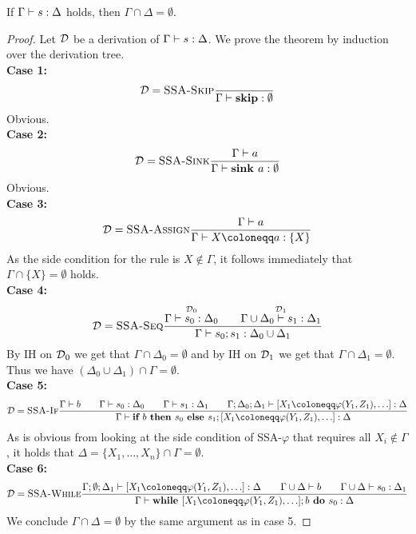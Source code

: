 \begin{theorem}
    If $\Gamma \vdash {s}: \Delta$ holds, then $\Gamma \cap \Delta = \emptyset$.
\end{theorem}
\begin{proof}
    Let $\operatorname{\mathcal{D}}$ be a derivation of $\Gamma \vdash {s}: \Delta$.
    We prove the theorem by induction over the derivation tree.\\
    \textbf{Case 1:}
    \begin{align*}
        \operatorname{\mathcal{D}} = \textsc{SSA-Skip}\frac{\displaystyle }{\displaystyle \Gamma \vdash {\textbf{skip}}: \emptyset}
    \end{align*}
    Obvious.\\
    \textbf{Case 2:}
    \begin{align*}
        \operatorname{\mathcal{D}} = \textsc{SSA-Sink}\frac{\displaystyle \Gamma \vdash {a}}{\displaystyle \Gamma \vdash {\textbf{sink }{a}}: \emptyset}
    \end{align*}
    Obvious.\\
    \textbf{Case 3:}
    \begin{align*}
        \D = \rule{SSA-Assign}{\typestmt{\Gamma}{a}}{\typestep{\Gamma}{\defaultstore}{\{X\}}}
    \end{align*}
    As the side condition for the rule is $X \notin \Gamma$, it follows immediately that 
    $\Gamma \cap \{X\} = \emptyset$ holds.\\
    \textbf{Case 4:}
    \begin{align*}
        \operatorname{\mathcal{D}} = \textsc{SSA-Seq}\frac{\displaystyle \overset{\operatorname{\mathcal{D}}_0}{\Gamma \vdash {s_0}: \Delta_0}\qquad
        \overset{\operatorname{\mathcal{D}}_1}{\Gamma \cup \Delta_0 \vdash {s_1}: \Delta_1}}{\displaystyle \Gamma \vdash {{s_0}; {s_1}}: \Delta_0 \cup \Delta_1}
    \end{align*}
    By IH on $\operatorname{\mathcal{D}}_0$ we get that $\Gamma \cap \Delta_0 = \emptyset$ and by IH on 
    $\operatorname{\mathcal{D}}_1$ we get that $\Gamma \cap \Delta_1 = \emptyset$.
    Thus we have $(\Delta_0 \cup \Delta_1) \cap \Gamma = \emptyset$.\\
    \textbf{Case 5:}
    \begin{align*}
        \D = \rule{SSA-If}{\typestmt{\Gamma}{b}\qquad
        \typestep{\Gamma}{s_0}{\Delta_0}\qquad \typestep{\Gamma}{s_1}{\Delta_1}\qquad
        \typestep{\Gamma;\Delta_0;\Delta_1}{\defaultphilist}{\Delta}}
        {\typestep{\Gamma}{\defaultssaif}{\Delta}}
    \end{align*}
    As is obvious from looking at the side condition of \textsc{SSA-$\varphi$} that requires all
    $X_i \notin \Gamma$, it holds that $\Delta = \{X_1, \ldots, X_n\} \cap \Gamma = \emptyset$.\\
    \textbf{Case 6:}
    \begin{align*}
        \D = \rule{SSA-While}{\typestep{\Gamma;\emptyset;\Delta_1}{\defaultphilist}{\Delta}\qquad
        \typestmt{\Gamma \cup \Delta}{b}\qquad\typestep{\Gamma \cup \Delta}{s_0}{\Delta_1}}
        {\typestep{\Gamma}{\defaultssawhile}{\Delta}}
        \end{align*}
        We conclude $\Gamma \cap \Delta = \emptyset$ by the same argument as in case 5.
\end{proof}

